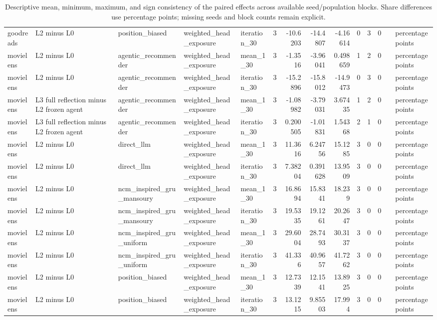 \begin{table}[htbp!]
\begin{tabular}{lllllrrrrrrrll}
goodreads & L2 minus L0 & position\_biased & weighted\_head\_exposure & iteration\_30 & 3 & -10.6203 & -14.4807 & -4.16614 & 0 & 3 & 0 &  & percentage points \\
movielens & L2 minus L0 & agentic\_recommender & weighted\_head\_exposure & mean\_1\_30 & 3 & -1.3516 & -3.96041 & 0.498659 & 1 & 2 & 0 &  & percentage points \\
movielens & L2 minus L0 & agentic\_recommender & weighted\_head\_exposure & iteration\_30 & 3 & -15.2896 & -15.8012 & -14.9473 & 0 & 3 & 0 &  & percentage points \\
movielens & L3 full reflection minus L2 frozen agent & agentic\_recommender & weighted\_head\_exposure & mean\_1\_30 & 3 & -1.08982 & -3.79031 & 3.67435 & 1 & 2 & 0 &  & percentage points \\
movielens & L3 full reflection minus L2 frozen agent & agentic\_recommender & weighted\_head\_exposure & iteration\_30 & 3 & 0.200505 & -1.01831 & 1.54368 & 2 & 1 & 0 &  & percentage points \\
movielens & L2 minus L0 & direct\_llm & weighted\_head\_exposure & mean\_1\_30 & 3 & 11.3616 & 6.24756 & 15.1285 & 3 & 0 & 0 &  & percentage points \\
movielens & L2 minus L0 & direct\_llm & weighted\_head\_exposure & iteration\_30 & 3 & 7.38204 & 0.391628 & 13.9509 & 3 & 0 & 0 &  & percentage points \\
movielens & L2 minus L0 & ncm\_inspired\_gru\_mansoury & weighted\_head\_exposure & mean\_1\_30 & 3 & 16.8694 & 15.8341 & 18.239 & 3 & 0 & 0 &  & percentage points \\
movielens & L2 minus L0 & ncm\_inspired\_gru\_mansoury & weighted\_head\_exposure & iteration\_30 & 3 & 19.5335 & 19.1261 & 20.2647 & 3 & 0 & 0 &  & percentage points \\
movielens & L2 minus L0 & ncm\_inspired\_gru\_uniform & weighted\_head\_exposure & mean\_1\_30 & 3 & 29.6004 & 28.7493 & 30.3137 & 3 & 0 & 0 &  & percentage points \\
movielens & L2 minus L0 & ncm\_inspired\_gru\_uniform & weighted\_head\_exposure & iteration\_30 & 3 & 41.336 & 40.9657 & 41.7262 & 3 & 0 & 0 &  & percentage points \\
movielens & L2 minus L0 & position\_biased & weighted\_head\_exposure & mean\_1\_30 & 3 & 12.7339 & 12.1541 & 13.8925 & 3 & 0 & 0 &  & percentage points \\
movielens & L2 minus L0 & position\_biased & weighted\_head\_exposure & iteration\_30 & 3 & 13.1215 & 9.85503 & 17.994 & 3 & 0 & 0 &  & percentage points \\
\hline
\end{tabular}
\caption{Descriptive mean, minimum, maximum, and sign consistency of the paired effects across available seed/population blocks. Share differences use percentage points; missing seeds and block counts remain explicit.}
\label{chap:results:tab:rq6_seed_consistency_weighted_head_exposure}
\end{table}
